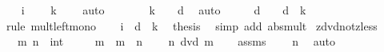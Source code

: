 \begin{isabellebody}
\isanewline
\ \ \isamarkupfalse%
\ {\isacartoucheopen}i\ {\isasymnoteq}\ {}{\isacartoucheclose}\ \isamarkupfalse%
\ {\isachardoublequoteopen}k\ {\isasymnoteq}\ {}{\isachardoublequoteclose}\ \isamarkupfalse%
\ auto\isanewline
\ \ \isamarkupfalse%
\ \isamarkupfalse%
\ {\isachardoublequoteopen}{}\ {\isasymle}\ {\isasymbar}k{\isasymbar}{\isachardoublequoteclose}\ \ {\isachardoublequoteopen}{}\ {\isasymle}\ {\isasymbar}d{\isasymbar}{\isachardoublequoteclose}\ \isamarkupfalse%
\ auto\isanewline
\ \ \isamarkupfalse%
\ \isamarkupfalse%
\ {\isachardoublequoteopen}{\isasymbar}d{\isasymbar}\ {\isacharasterisk}{\kern0pt}\ {}\ {\isasymle}\ {\isasymbar}d{\isasymbar}\ {\isacharasterisk}{\kern0pt}\ {\isasymbar}k{\isasymbar}{\isachardoublequoteclose}\ \isamarkupfalse%
\ {\isacharparenleft}{\kern0pt}rule\ mult{\isacharunderscore}{\kern0pt}left{\isacharunderscore}{\kern0pt}mono{\isacharparenright}{\kern0pt}\isanewline
\ \ \isamarkupfalse%
\ {\isacartoucheopen}i\ {\isacharequal}{\kern0pt}\ d\ {\isacharasterisk}{\kern0pt}\ k{\isacartoucheclose}\ \isamarkupfalse%
\ {\isacharquery}{\kern0pt}thesis\ \isamarkupfalse%
\ {\isacharparenleft}{\kern0pt}simp\ add{\isacharcolon}{\kern0pt}\ abs{\isacharunderscore}{\kern0pt}mult{\isacharparenright}{\kern0pt}\isanewline
{}\isamarkupfalse%
%
\endisatagproof
{\isafoldproof}%
%
\isadelimproof
\isanewline
%
\endisadelimproof
\isanewline
{}\isamarkupfalse%
\ zdvd{\isacharunderscore}{\kern0pt}not{\isacharunderscore}{\kern0pt}zless{\isacharcolon}{\kern0pt}\isanewline
\ \ \ m\ n\ {\isacharcolon}{\kern0pt}{\isacharcolon}{\kern0pt}\ int\isanewline
\ \ \ {\isachardoublequoteopen}{}\ {\isacharless}{\kern0pt}\ m{\isachardoublequoteclose}\ \ {\isachardoublequoteopen}m\ {\isacharless}{\kern0pt}\ n{\isachardoublequoteclose}\isanewline
\ \ \ {\isachardoublequoteopen}{\isasymnot}\ n\ dvd\ m{\isachardoublequoteclose}\isanewline
%
\isadelimproof
%
\endisadelimproof
%
\isatagproof
{}\isamarkupfalse%
\isanewline
\ \ \isamarkupfalse%
\ assms\ \isamarkupfalse%
\ {\isachardoublequoteopen}{}\ {\isacharless}{\kern0pt}\ n{\isachardoublequoteclose}\ \isamarkupfalse%
\ auto\isanewline
\ \ \isamarkupfalse%

\end{isabellebody}

